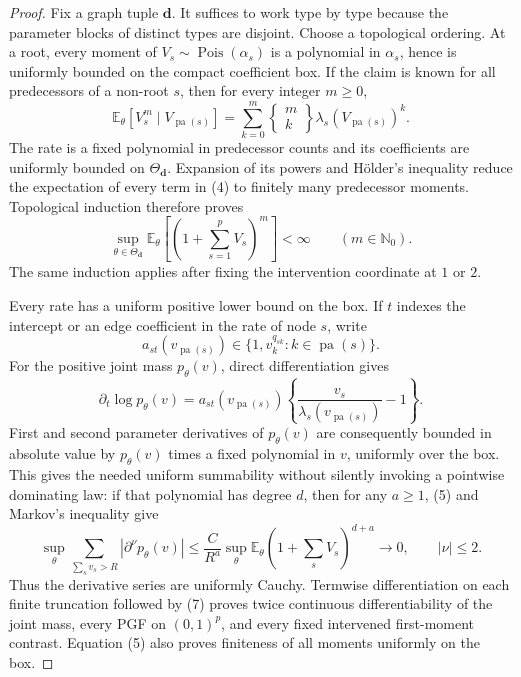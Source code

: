 \documentclass{article}
\begin{document}
\begin{proof}
Fix a graph tuple \(\boldsymbol d\).  It suffices to work type by type because the parameter blocks of distinct types are disjoint.  Choose a topological ordering.  At a root, every moment of \(V_s\sim\operatorname{Pois}(\alpha_s)\) is a polynomial in \(\alpha_s\), hence is uniformly bounded on the compact coefficient box.  If the claim is known for all predecessors of a non-root \(s\), then for every integer \(m\geq0\),
\[
 \mathbb E_\theta[V_s^m\mid V_{\operatorname{pa}(s)}]
 =\sum_{k=0}^{m}
 \left\{\begin{matrix}m\\ k\end{matrix}\right\}
 \lambda_s(V_{\operatorname{pa}(s)})^k. \tag{4}
\]
The rate is a fixed polynomial in predecessor counts and its coefficients are uniformly bounded on \(\Theta_{\boldsymbol d}\).  Expansion of its powers and H\"older's inequality reduce the expectation of every term in (4) to finitely many predecessor moments.  Topological induction therefore proves
\[
 \sup_{\theta\in\Theta_{\boldsymbol d}}
 \mathbb E_\theta\!\left[\left(1+\sum_{s=1}^pV_s\right)^m\right]<\infty
 \qquad(m\in\mathbb N_0). \tag{5}
\]
The same induction applies after fixing the intervention coordinate at \(1\) or \(2\).

Every rate has a uniform positive lower bound on the box.  If \(t\) indexes the intercept or an edge coefficient in the rate of node \(s\), write
\[
 a_{st}(v_{\operatorname{pa}(s)})
 \in\{1,v_k^{q_{sk}}:k\in\operatorname{pa}(s)\}.
\]
For the positive joint mass \(p_\theta(v)\), direct differentiation gives
\[
 \partial_t\log p_\theta(v)=
 a_{st}(v_{\operatorname{pa}(s)})
 \left\{\frac{v_s}{\lambda_s(v_{\operatorname{pa}(s)})}-1\right\}. \tag{6}
\]
First and second parameter derivatives of \(p_\theta(v)\) are consequently bounded in absolute value by \(p_\theta(v)\) times a fixed polynomial in \(v\), uniformly over the box.  This gives the needed uniform summability without silently invoking a pointwise dominating law: if that polynomial has degree \(d\), then for any \(a\geq1\), (5) and Markov's inequality give
\[
 \sup_\theta\sum_{\sum_s v_s>R}
 |\partial^\nu p_\theta(v)|
 \leq \frac{C}{R^a}
 \sup_\theta\mathbb E_\theta
 \left(1+\sum_sV_s\right)^{d+a}
 \longrightarrow0,
 \qquad |\nu|\leq2. \tag{7}
\]
Thus the derivative series are uniformly Cauchy.  Termwise differentiation on each finite truncation followed by (7) proves twice continuous differentiability of the joint mass, every PGF on \((0,1)^p\), and every fixed intervened first-moment contrast.  Equation (5) also proves finiteness of all moments uniformly on the box.


\end{proof}
\end{document}
